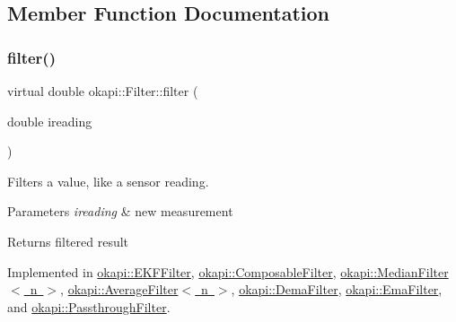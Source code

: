 \subsection{Member Function Documentation}
\mbox{\label{classokapi_1_1Filter_a7c2ea0b64b37b688900189856d58da15}} 
\subsubsection{\texorpdfstring{filter()}{filter()}}
{\footnotesize\ttfamily virtual double okapi\+::\+Filter\+::filter (\begin{DoxyParamCaption}\item[{double}]{ireading }\end{DoxyParamCaption})\hspace{0.3cm}{\ttfamily [pure virtual]}}

Filters a value, like a sensor reading.


\begin{DoxyParams}{Parameters}
{\em ireading} & new measurement \\
\hline
\end{DoxyParams}
\begin{DoxyReturn}{Returns}
filtered result 
\end{DoxyReturn}


Implemented in \mbox{\hyperlink{classokapi_1_1EKFFilter_a7deb4e14f154247b5521afa7603d09fd}{okapi\+::\+E\+K\+F\+Filter}}, \mbox{\hyperlink{classokapi_1_1ComposableFilter_a76925f04dcd186b249e5bfb169f27992}{okapi\+::\+Composable\+Filter}}, \mbox{\hyperlink{classokapi_1_1MedianFilter_a91e4104c4862082cd17ab92b43c02fab}{okapi\+::\+Median\+Filter$<$ n $>$}}, \mbox{\hyperlink{classokapi_1_1AverageFilter_a6030d718df73a9a1d7a99c104c3e564e}{okapi\+::\+Average\+Filter$<$ n $>$}}, \mbox{\hyperlink{classokapi_1_1DemaFilter_a2d0eb2feae37ceacc865023ac4997ff1}{okapi\+::\+Dema\+Filter}}, \mbox{\hyperlink{classokapi_1_1EmaFilter_aeb460ae6655441806591e076342245de}{okapi\+::\+Ema\+Filter}}, and \mbox{\hyperlink{classokapi_1_1PassthroughFilter_a359570b00c564dde65e02c6485079544}{okapi\+::\+Passthrough\+Filter}}.

\mbox{\label{classokapi_1_1Filter_a3469cd4bc108f8accf300d9f5cc9f42f}} 
